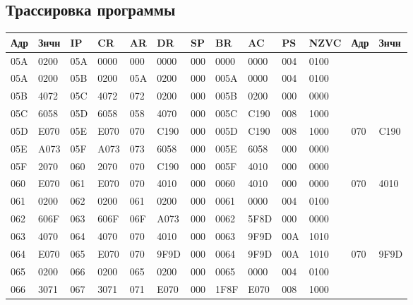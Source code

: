 \documentclass[14pt]{extreport}
\begin{document}
        \begin{landscape}
            \chapter{Трассировка программы}
            \begin{table}[!h]
                \centering
                \begin{tabular}{|l|l|l|l|l|l|l|l|l|l|l|l|l|}
                    \hline
                    Адр & Знчн & IP & CR & AR & DR & SP & BR & AC & PS & NZVC & Адр & Знчн \\ \hline
                    05A & 0200 & 05A & 0000 & 000 & 0000 & 000 & 0000 & 0000 & 004 & 0100 & ~ & ~ \\ \hline
                    05A & 0200 & 05B & 0200 & 05A & 0200 & 000 & 005A & 0000 & 004 & 0100 & ~ & ~ \\ \hline
                    05B & 4072 & 05C & 4072 & 072 & 0200 & 000 & 005B & 0200 & 000 & 0000 & ~ & ~ \\ \hline
                    05C & 6058 & 05D & 6058 & 058 & 4070 & 000 & 005C & C190 & 008 & 1000 & ~ & ~ \\ \hline
                    05D & E070 & 05E & E070 & 070 & C190 & 000 & 005D & C190 & 008 & 1000 & 070 & C190 \\ \hline
                    05E & A073 & 05F & A073 & 073 & 6058 & 000 & 005E & 6058 & 000 & 0000 & ~ & ~ \\ \hline
                    05F & 2070 & 060 & 2070 & 070 & C190 & 000 & 005F & 4010 & 000 & 0000 & ~ & ~ \\ \hline
                    060 & E070 & 061 & E070 & 070 & 4010 & 000 & 0060 & 4010 & 000 & 0000 & 070 & 4010 \\ \hline
                    061 & 0200 & 062 & 0200 & 061 & 0200 & 000 & 0061 & 0000 & 004 & 0100 & ~ & ~ \\ \hline
                    062 & 606F & 063 & 606F & 06F & A073 & 000 & 0062 & 5F8D & 000 & 0000 & ~ & ~ \\ \hline
                    063 & 4070 & 064 & 4070 & 070 & 4010 & 000 & 0063 & 9F9D & 00A & 1010 & ~ & ~ \\ \hline
                    064 & E070 & 065 & E070 & 070 & 9F9D & 000 & 0064 & 9F9D & 00A & 1010 & 070 & 9F9D \\ \hline
                    065 & 0200 & 066 & 0200 & 065 & 0200 & 000 & 0065 & 0000 & 004 & 0100 & ~ & ~ \\ \hline
                    066 & 3071 & 067 & 3071 & 071 & E070 & 000 & 1F8F & E070 & 008 & 1000 & ~ & ~ \\ \hline

\end{tabular}
\end{table}
\end{landscape}
\end{document}
